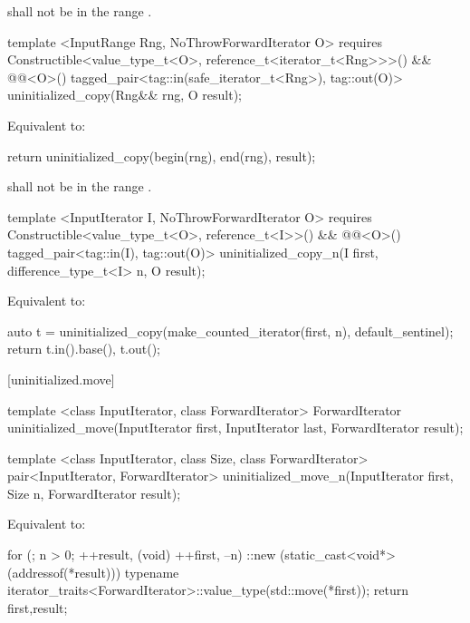 {\color{addclr}
\requires {} shall not be in the range .

\begin{codeblock}
template <InputRange Rng, NoThrowForwardIterator O>
  requires Constructible<value_type_t<O>, reference_t<iterator_t<Rng>>>() &&
           @@<O>()
    tagged_pair<tag::in(safe_iterator_t<Rng>), tag::out(O)>
    uninitialized_copy(Rng&& rng, O result);
\end{codeblock}

\pnum
\effects Equivalent to:
\begin{codeblock}
        return uninitialized_copy(begin(rng), end(rng), result);
\end{codeblock}

\pnum
\requires {} shall not be in the range .

\begin{codeblock}
template <InputIterator I, NoThrowForwardIterator O>
  requires Constructible<value_type_t<O>, reference_t<I>>() &&
           @@<O>()
    tagged_pair<tag::in(I), tag::out(O)>
    uninitialized_copy_n(I first, difference_type_t<I> n, O result);
\end{codeblock}

\pnum
\effects Equivalent to:
\begin{codeblock}
        auto t = uninitialized_copy(make_counted_iterator(first, n),
                                    default_sentinel{});
        return {t.in().base(), t.out()};
\end{codeblock}

\requires {}
} %

[uninitialized.move]{}
{\color{remclr}
\begin{codeblock}
template <class InputIterator, class ForwardIterator>
  ForwardIterator uninitialized_move(InputIterator first, InputIterator last,
                                     ForwardIterator result);
\end{codeblock}

\begin{codeblock}
template <class InputIterator, class Size, class ForwardIterator>
  pair<InputIterator, ForwardIterator>
    uninitialized_move_n(InputIterator first, Size n, ForwardIterator result);
\end{codeblock}

\setcounter{Paras}{2}
\pnum
\effects Equivalent to:
\begin{codeblock}
        for (; n > 0; ++result, (void) ++first, --n)
          ::new (static_cast<void*>(addressof(*result)))
            typename iterator_traits<ForwardIterator>::value_type(std::move(*first));
        return {first,result};
\end{codeblock}
} %

